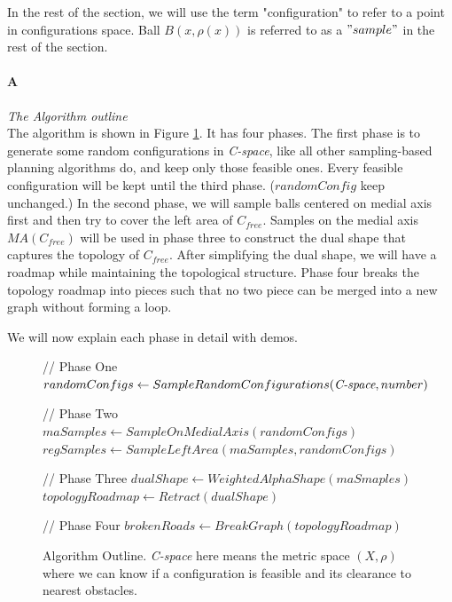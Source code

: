 \documentclass[11pt]{article}
\begin{document}
\indent In the rest of the section, we will use the term "configuration" to refer to a point in configurations space.  Ball $B(x, \rho(x))$ is referred to as a $"sample"$ in the rest of the section. 

\paragraph{A} \emph{The Algorithm outline} \hfill \\

\indent The algorithm is shown in Figure \ref{fig:Algo}. It has four phases. The first phase is to generate some random configurations in \emph{C-space}, like all other sampling-based planning algorithms do, and keep only those feasible ones. Every feasible configuration will be kept until the third phase. ($randomConfig$ keep unchanged.) In the second phase, we will sample balls centered on medial axis first and then try to cover the left area of $C_{free}$. Samples on the medial axis $MA(C_{free})$ will be used in phase three to construct the dual shape that captures the topology of $C_{free}$. After simplifying the dual shape, we will have a roadmap while maintaining the topological structure. Phase four breaks the topology roadmap into pieces such that no two piece can be merged into a new graph without forming a loop. 

\indent We will now explain each phase in detail with demos.

\begin{figure}
  \begin{algorithmic}[1]
  
    // Phase One
    \indent \State $randomConfigs \gets SampleRandomConfigurations( \emph{C-space}, number )$ 

    // Phase Two
    \indent \State $maSamples \gets SampleOnMedialAxis( randomConfigs )$
    \indent \State $regSamples \gets SampleLeftArea(maSamples, randomConfigs)$

    // Phase Three
    \indent \State $dualShape \gets WeightedAlphaShape( maSmaples )$
    \indent \State $topologyRoadmap \gets Retract(dualShape)$ 

    // Phase Four
    \indent \State $brokenRoads \gets BreakGraph( topologyRoadmap )$
    
    \indent 
	
  \EndFunction
  \end{algorithmic}
  \caption{\label{fig:Algo} Algorithm Outline. \emph{C-space} here means the metric space $(X, \rho)$ where we can know if a configuration is feasible and its clearance to nearest obstacles.}
\end{figure}
\end{document}
